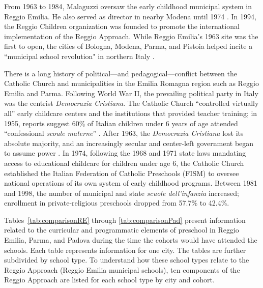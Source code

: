 From 1963 to 1984, Malaguzzi oversaw the early childhood municipal system in Reggio Emilia. He also served as director in nearby Modena until 1974 \citep{Cagliari-etal-eds_2016_BOOK_Loris-Malaguzzi}. In 1994, the Reggio Children organization was founded to promote the international implementation of the Reggio Approach. While Reggio Emilia's 1963 site was the first to open, the cities of Bologna, Modena, Parma, and Pistoia helped incite a ``municipal school revolution" in northern Italy \citep{Hohnerlein_2015_Development-and-Diffusion}. 

There is a long history of political---and pedagogical---conflict between the Catholic Church and municipalities in the Emilia Romagna region such as Reggio Emilia and Parma. Following World War II, the prevailing political party in Italy was the centrist \textit{Democrazia Cristiana}. The Catholic Church ``controlled virtually all'' early childcare centers and the institutions that provided teacher training; in 1955, reports suggest 60\% of Italian children under 6 years of age attended ``confessional \textit{scoule materne}'' \citep{Hohnerlein_2015_Development-and-Diffusion}. After 1963, the \textit{Democrazia Cristiana} lost its absolute majority, and an increasingly secular and center-left government began to assume power \citep{Hohnerlein_2009_Paradox-Public-Preschools}. In 1974, following the 1968 and 1971 state laws mandating access to educational childcare for children under age 6, the Catholic Church established the Italian Federation of Catholic Preschools (FISM) to oversee national operations of its own system of early childhood programs. Between 1981 and 1998, the number of municipal and state \textit{scuole dell'infanzia} increased; enrollment in private-religious preschools dropped from 57.7\% to 42.4\%.

Tables~\ref{tab:comparisonRE} through \ref{tab:comparisonPad} present information related to the curricular and programmatic elements of preschool in Reggio Emilia, Parma, and Padova during the time the cohorts would have attended the schools. Each table represents information for one city. The tables are further subdivided by school type. To understand how these school types relate to the Reggio Approach (Reggio Emilia municipal schools), ten components of the Reggio Approach are listed for each school type by city and cohort. 

